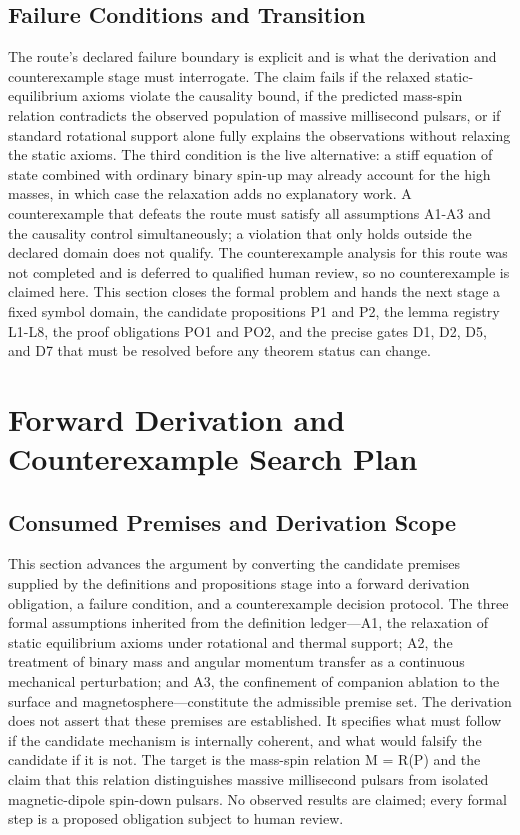 \documentclass[conference]{IEEEtran}
\begin{document}
\subsection{Failure Conditions and Transition}
The route's declared failure boundary is explicit and is what the derivation and counterexample stage must interrogate. The claim fails if the relaxed static-equilibrium axioms violate the causality bound, if the predicted mass-spin relation contradicts the observed population of massive millisecond pulsars, or if standard rotational support alone fully explains the observations without relaxing the static axioms. The third condition is the live alternative: a stiff equation of state combined with ordinary binary spin-up may already account for the high masses, in which case the relaxation adds no explanatory work. A counterexample that defeats the route must satisfy all assumptions A1-A3 and the causality control simultaneously; a violation that only holds outside the declared domain does not qualify. The counterexample analysis for this route was not completed and is deferred to qualified human review, so no counterexample is claimed here. This section closes the formal problem and hands the next stage a fixed symbol domain, the candidate propositions P1 and P2, the lemma registry L1-L8, the proof obligations PO1 and PO2, and the precise gates D1, D2, D5, and D7 that must be resolved before any theorem status can change.

\section{Forward Derivation and Counterexample Search Plan}
\subsection{Consumed Premises and Derivation Scope}
This section advances the argument by converting the candidate premises supplied by the definitions and propositions stage into a forward derivation obligation, a failure condition, and a counterexample decision protocol. The three formal assumptions inherited from the definition ledger---A1, the relaxation of static equilibrium axioms under rotational and thermal support; A2, the treatment of binary mass and angular momentum transfer as a continuous mechanical perturbation; and A3, the confinement of companion ablation to the surface and magnetosphere---constitute the admissible premise set. The derivation does not assert that these premises are established. It specifies what must follow if the candidate mechanism is internally coherent, and what would falsify the candidate if it is not. The target is the mass-spin relation M = R(P) and the claim that this relation distinguishes massive millisecond pulsars from isolated magnetic-dipole spin-down pulsars. No observed results are claimed; every formal step is a proposed obligation subject to human review.
\end{document}
